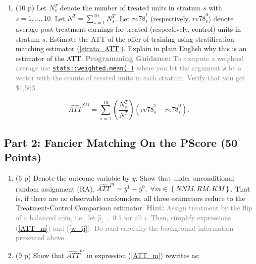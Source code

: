 \documentclass[
]{article}
\providecommand{\tightlist}{%
  \setlength{\itemsep}{0pt}\setlength{\parskip}{0pt}}
\begin{document}
\begin{enumerate}
  \begin{enumerate}
  \def\labelenumii{\alph{enumii}.}
  \setcounter{enumii}{2}
  \tightlist
  \item
    (10 p) Let \(N_{s}^{T}\) denote the number of treated units in
    stratum \(s\) with \(s=1,...,10\). Let
    \(N^{T}=\sum_{s=1}^{10}N_{s}^{T}\). Let \(\overline{re78}_{s}^{1}\)
    (respectively, \(\overline{re78}_{s}^{0}\)) denote average
    post-treatment earnings for treated (respectively, control) units in
    stratum \(s\). Estimate the ATT of the offer of training using
    stratification matching estimator (\ref{strata_ATT}). Explain in
    plain English why this is an estimator of the ATT.
    \textcolor{gray}{\textbf{Programming Guidance:} To compute a weighted average use \href{https://www.rdocumentation.org/packages/stats/versions/3.6.2/topics/weighted.mean}{\texttt{stats::weighted.mean( )}} where you let the argument \texttt{w} be a vector with the counts of treated units in each stratum. Verify that you get \$1,563.}\label{item:naive-ATT-estimate}
  \end{enumerate}

  \begin{equation}
   \widehat{ATT}^{SM}=\sum_{s=1}^{10}\left( \frac{N_{s}^{T}}{N^{T}}\right) \left( \overline{re78}_{s}^{1}-\overline{re78}_{s}^{0}\right) 
   \text{.}\label{strata_ATT}
   \end{equation}
\end{enumerate}

\subsection{Part 2: Fancier Matching On the PScore (50
Points)}\label{part-2-fancier-matching-on-the-pscore-50-points}


\newpage

\begin{enumerate}
\def\labelenumi{\arabic{enumi}.}
\setcounter{enumi}{3}
\item
  (6 p) Denote the outcome variable by \(y\). Show that under
  unconditional random assignment (RA),
  \(\widehat{ATT}^{m}=\overline{y}^{1}-\overline{y}^{0},\)
  \(\forall m\in \left\{ NNM,RM,KM\right\}\). That is, if there are no
  observable confounders, all three estimators reduce to the
  Treatment-Control Comparison estimator.
  \textcolor{gray}{\textbf{Hint:} Assign treatment by the flip of a balanced coin, i.e., let $\widehat{p}_{i}=0.5$ for all $i$. Then, simplify expressions (\ref{ATT_m}) and (\ref{w_ij}). Do read carefully the background information presented above.}
\item
  (9 p) Show that \(\widehat{ATT}^{m}\) in expression (\ref{ATT_m})
  rewrites as:
\end{enumerate}
\end{document}
